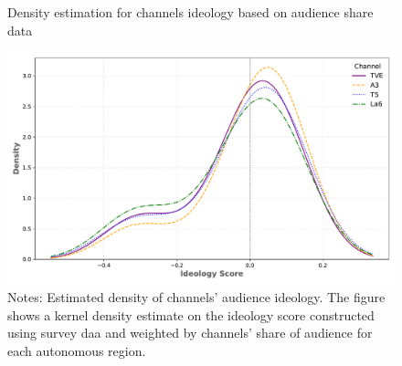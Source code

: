 \documentclass[12pt]{article}
\begin{document}
	

	
	
	\begin{figure}[ht!]
		\centering
		\caption{Density estimation for channels ideology based on audience share data}
		\includegraphics[width=120mm]{figures/channel_ideology_density_python}
		\caption*{\small Notes: Estimated density of channels' audience ideology. The figure shows a kernel density estimate on the ideology score constructed using survey daa and weighted by channels' share of audience for each autonomous region. }
		\label{fig:density}
	\end{figure}
	
\end{document}
